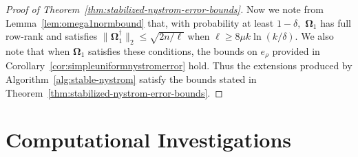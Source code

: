 \documentclass[11pt,letterpaper,twoside,reqno,nosumlimits]{amsart}
\def\pinv{\dagger}
\def\transp{T}
\newcommand{\mat}[1]{\ensuremath{\mathbf{#1}}}
\newcommand{\snorm}[1]{\ensuremath{\big\|#1\big\|_2}}
\theoremstyle{remark}
\newtheorem{remark}{Remark}
\begin{document}
\begin{proof}[Proof of Theorem~\ref{thm:stabilized-nystrom-error-bounds}]
Now we note from Lemma~\ref{lem:omega1normbound} that, with probability at least $1-\delta,$ $\mat{\Omega}_1$ has full row-rank and satisfies $\snorm{\mat{\Omega}_1^\pinv} \leq \sqrt{2n/\ell}$ when $\ell \geq 8\mu k \ln (k/\delta).$ We also note that when $\mat{\Omega}_1$ satisfies these conditions, the bounds on $e_\rho$ provided in  Corollary~\ref{cor:simpleuniformnystromerror} hold. Thus the extensions produced by Algorithm~\ref{alg:stable-nystrom} satisfy the bounds stated in Theorem~\ref{thm:stabilized-nystrom-error-bounds}.
\end{proof}

%  

\section{Computational Investigations}
\label{sec:experiments}
\end{document}
